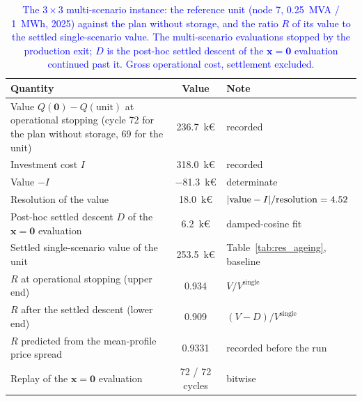 \documentclass[preprint,12pt]{elsarticle}
\begin{document}
\begin{table}[htbp!]
    \centering
    \caption{\textcolor{blue}{The $3 \times 3$ multi-scenario instance: the reference unit (node 7, 0.25~MVA / 1~MWh, 2025) against the plan without storage, and the ratio $R$ of its value to the settled single-scenario value. The multi-scenario evaluations stopped by the production exit; $D$ is the post-hoc settled descent of the $\boldsymbol{x} = \boldsymbol{0}$ evaluation continued past it. Gross operational cost, settlement excluded.}}
    \label{tab:res_multiscenario}
    \scriptsize\setlength{\tabcolsep}{4pt}
    \begin{tabular}{l c l}
        \toprule
        Quantity & Value & Note \\
        \midrule    
        Value $Q(\boldsymbol{0}) - Q(\text{unit})$ at operational stopping (cycle 72 for the plan without storage, 69 for the unit) & 236.7~k\euro & recorded \\
        Investment cost $I$                                                  & 318.0~k\euro & recorded \\
        Value $- I$                                                          & $-$81.3~k\euro & determinate \\
        Resolution of the value                                              & 18.0~k\euro  & $|{\rm value} - I| / {\rm resolution} = 4.52$ \\
        Post-hoc settled descent $D$ of the $\boldsymbol{x} = \boldsymbol{0}$ evaluation & 6.2~k\euro & damped-cosine fit \\
        Settled single-scenario value of the unit                           & 253.5~k\euro & Table~\ref{tab:res_ageing}, baseline \\
        $R$ at operational stopping (upper end)                                     & 0.934 & $V / V^{\text{single}}$ \\
        $R$ after the settled descent (lower end)                            & 0.909 & $(V - D) / V^{\text{single}}$ \\
        $R$ predicted from the mean-profile price spread                     & 0.9331 & recorded before the run \\
        Replay of the $\boldsymbol{x} = \boldsymbol{0}$ evaluation           & 72 / 72 cycles & bitwise \\
        \bottomrule
    \end{tabular}
\end{table}

\end{document}
